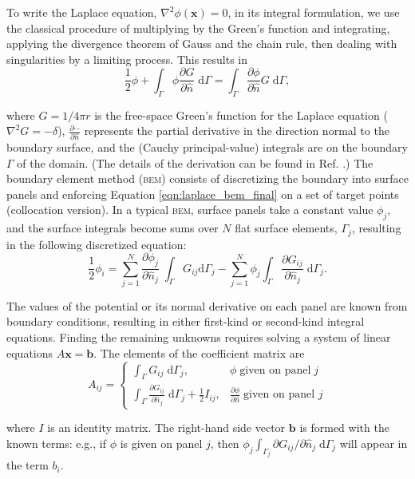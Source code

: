\documentclass[final,3p,times]{elsarticle}
\newcommand{\bem}{\textsc{bem}\xspace}
\newcommand{\di}[1]{\text{d}#1}
\newcommand{\partiald}[2]{\frac{\partial #1}{\partial #2}}
\newcommand{\partialdi}[2]{\partial #1 / \partial #2}
\newcommand{\nhat}{\hat{n}}
\newcommand{\vect}[1]{\mathbf{#1}}
\begin{document}
To write the Laplace equation, $\nabla^{2}\phi(\vect{x}) = 0$,  in its integral formulation, we use the classical procedure of multiplying by the Green's function and integrating, applying the divergence theorem of Gauss and the chain rule, then dealing with singularities by a limiting process. This results in
%
\begin{equation}\label{eqn:laplace_bem_final}
	\frac{1}{2}\phi + \int_{\Gamma} \phi\partiald{G}{\nhat}\;\di{\Gamma} = \int_{\Gamma}\partiald{\phi}{\nhat}G\;\di{\Gamma},
\end{equation}

\noindent where $G = 1/4\pi r$ is the free-space Green's function for the Laplace equation ($\nabla^{2}G = -\delta$),  $\partiald{\cdots}{\nhat}$ represents the partial derivative in the direction normal to the boundary surface, and the (Cauchy principal-value) integrals are on the boundary $\Gamma$ of the domain. (The details of the derivation can be found in Ref. \cite{BrebbiaDominguez1992}.) The boundary element method (\bem) consists of discretizing the boundary into surface panels and enforcing Equation \eqref{eqn:laplace_bem_final} on a set of target points (collocation version). In a typical \bem, surface panels take a constant value $\phi_j$, and the surface integrals become sums over $N$ flat surface elements, $\Gamma_j$, resulting in the following discretized equation:
%
\begin{equation}
	\frac{1}{2}\phi_i = \sum_{j=1}^{N} \partiald{\phi_j}{\nhat_j}\;\int_{\Gamma}G_{ij}\di{\Gamma_j} - \sum_{j=1}^{N} \phi_j\int_{\Gamma}\partiald{G_{ij}}{\nhat_j}\;\di{\Gamma_j}.
\end{equation}

The values of the potential or its normal derivative on each panel are known from boundary conditions, resulting in either first-kind or second-kind integral equations. Finding the remaining unknowns requires solving a system of linear equations $A\vect{x}=\vect{b}$. The elements of the coefficient matrix are
%
\begin{equation} \label{eqn:laplace_matrix}
	A_{ij} = 
	\begin{cases}
		\int_{\Gamma} G_{ij}\;\di{\Gamma_j}, & \phi\;\text{given on panel}\;j \\
		\int_{\Gamma} \partiald{G_{ij}}{\nhat_j}\;\di{\Gamma_j} + \frac{1}{2} I_{ij}, & \partiald{\phi}{\nhat}\;\text{given on panel } j
	\end{cases}
\end{equation}

\noindent
where $I$ is an identity matrix. The right-hand side vector $\vect{b}$ is formed with the known terms: e.g., if $\phi$ is given on panel $j$, then $\phi_j\int_{\Gamma_j}\partialdi{G_{ij}}{\nhat_j}\;\di{\Gamma_j}$ will appear in the term $b_i$.
\end{document}
